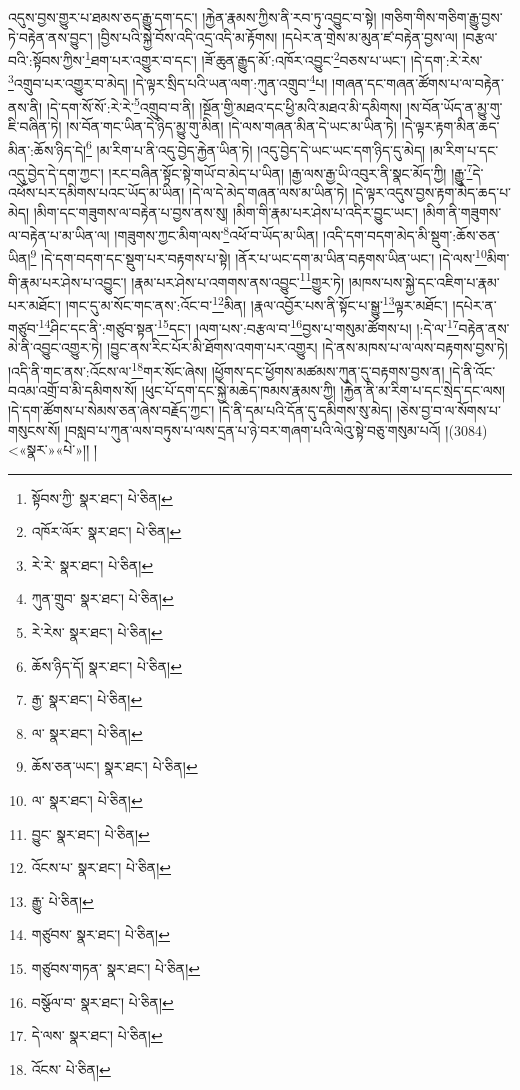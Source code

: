 འདུས་བྱས་གྱུར་པ་ཐམས་ཅད་རྒྱུ་དག་དང་། །རྐྱེན་རྣམས་ཀྱིས་ནི་རབ་ཏུ་འབྱུང་བ་སྟེ། །གཅིག་གིས་གཅིག་རྒྱུ་བྱས་ཏེ་བརྟེན་ནས་བྱུང་། །བྱིས་པའི་སྐྱེ་བོས་འདི་འདྲ་འདི་མ་རྟོགས། །དཔེར་ན་གྲེས་མ་མུན་ཛ་བརྟེན་བྱས་ལ། །བརྩལ་བའི་:སྟོབས་ཀྱིས་\footnote{སྟོབས་ཀྱི་  སྣར་ཐང་།  པེ་ཅིན། }ཐག་པར་འགྱུར་བ་དང་། །ཟོ་ཆུན་རྒྱུད་མོ་:འཁོར་འབྱུང་\footnote{འཁོར་ལོར་  སྣར་ཐང་།  པེ་ཅིན། }བཅས་པ་ཡང་། །དེ་དག་:རེ་རེས་\footnote{རེ་རེ་  སྣར་ཐང་།  པེ་ཅིན། }འགྲུབ་པར་འགྱུར་བ་མེད། །དེ་ལྟར་སྲིད་པའི་ཡན་ལག་:ཀུན་འགྲུབ་\footnote{ཀུན་གྲུབ་  སྣར་ཐང་།  པེ་ཅིན། }པ། །གཞན་དང་གཞན་ཚོགས་པ་ལ་བརྟེན་ནས་ནི། །དེ་དག་སོ་སོ་:རེ་རེ་\footnote{རེ་རེས་  སྣར་ཐང་།  པེ་ཅིན། }འགྲུབ་བ་ནི། །སྔོན་གྱི་མཐའ་དང་ཕྱི་མའི་མཐའ་མི་དམིགས། །ས་བོན་ཡོད་ན་མྱུ་གུ་ཇི་བཞིན་ཏེ། །ས་བོན་གང་ཡིན་དེ་ཉིད་མྱུ་གུ་མིན། །དེ་ལས་གཞན་མིན་དེ་ཡང་མ་ཡིན་ཏེ། །དེ་ལྟར་རྟག་མིན་ཆད་མིན་:ཆོས་ཉིད་དེ།\footnote{ཆོས་ཉིད་དོ།  སྣར་ཐང་།  པེ་ཅིན། } །མ་རིག་པ་ནི་འདུ་བྱེད་རྐྱེན་ཡིན་ཏེ། །འདུ་བྱེད་དེ་ཡང་ཡང་དག་ཉིད་དུ་མེད། །མ་རིག་པ་དང་འདུ་བྱེད་དེ་དག་ཀྱང་། །རང་བཞིན་སྟོང་སྟེ་གཡོ་བ་མེད་པ་ཡིན། །རྒྱ་ལས་རྒྱ་ཡི་འབུར་ནི་སྣང་མོད་ཀྱི། །རྒྱུ་\footnote{རྒྱ་  སྣར་ཐང་།  པེ་ཅིན། }དེ་འཕོས་པར་དམིགས་པའང་ཡོད་མ་ཡིན། །དེ་ལ་དེ་མེད་གཞན་ལས་མ་ཡིན་ཏེ། །དེ་ལྟར་འདུས་བྱས་རྟག་མེད་ཆད་པ་མེད། །མིག་དང་གཟུགས་ལ་བརྟེན་པ་བྱས་ནས་སུ། །མིག་གི་རྣམ་པར་ཤེས་པ་འདིར་བྱུང་ཡང་། །མིག་ནི་གཟུགས་ལ་བརྟེན་པ་མ་ཡིན་ལ། །གཟུགས་ཀྱང་མིག་ལས་\footnote{ལ་  སྣར་ཐང་།  པེ་ཅིན། }འཕོ་བ་ཡོད་མ་ཡིན། །འདི་དག་བདག་མེད་མི་སྡུག་:ཆོས་ཅན་ཡིན།\footnote{ཆོས་ཅན་ཡང་།  སྣར་ཐང་།  པེ་ཅིན། } །དེ་དག་བདག་དང་སྡུག་པར་བརྟགས་པ་སྟེ། །ནོར་པ་ཡང་དག་མ་ཡིན་བརྟགས་ཡིན་ཡང་། །དེ་ལས་\footnote{ལ་  སྣར་ཐང་།  པེ་ཅིན། }མིག་གི་རྣམ་པར་ཤེས་པ་འབྱུང་། །རྣམ་པར་ཤེས་པ་འགགས་ནས་འབྱུང་\footnote{བྱུང་  སྣར་ཐང་།  པེ་ཅིན། }གྱུར་ཏེ། །མཁས་པས་སྐྱེ་དང་འཇིག་པ་རྣམ་པར་མཐོང་། །གང་དུ་མ་སོང་གང་ནས་:འོང་བ་\footnote{འོངས་པ་  སྣར་ཐང་།  པེ་ཅིན། }མིན། །རྣལ་འབྱོར་པས་ནི་སྟོང་པ་སྒྱུ་\footnote{རྒྱུ་  པེ་ཅིན། }ལྟར་མཐོང་། །དཔེར་ན་གཙུབ་\footnote{གཙུབས་  སྣར་ཐང་།  པེ་ཅིན། }ཤིང་དང་ནི་:གཙུབ་སྟན་\footnote{གཙུབས་གཏན་  སྣར་ཐང་།  པེ་ཅིན། }དང་། །ལག་པས་:བརྩལ་བ་\footnote{བསྩོལ་བ་  སྣར་ཐང་།  པེ་ཅིན། }བྱས་པ་གསུམ་ཚོགས་པ། །:དེ་ལ་\footnote{དེ་ལས་  སྣར་ཐང་།  པེ་ཅིན། }བརྟེན་ནས་མེ་ནི་འབྱུང་འགྱུར་ཏེ། །བྱུང་ནས་རིང་པོར་མི་ཐོགས་འགག་པར་འགྱུར། །དེ་ནས་མཁས་པ་ལ་ལས་བརྟགས་བྱས་ཏེ། །འདི་ནི་གང་ནས་:འོངས་ལ་\footnote{འོངས་  པེ་ཅིན། }གར་སོང་ཞེས། །ཕྱོགས་དང་ཕྱོགས་མཚམས་ཀུན་དུ་བརྟགས་བྱས་ན། །དེ་ནི་འོང་བའམ་འགྲོ་བ་མི་དམིགས་སོ། །ཕུང་པོ་དག་དང་སྐྱེ་མཆེད་ཁམས་རྣམས་ཀྱི། །རྐྱེན་ནི་མ་རིག་པ་དང་སྲེད་དང་ལས། །དེ་དག་ཚོགས་པ་སེམས་ཅན་ཞེས་བརྗོད་ཀྱང་། །དེ་ནི་དམ་པའི་དོན་དུ་དམིགས་སུ་མེད། །ཅེས་བྱ་བ་ལ་སོགས་པ་གསུངས་སོ། །བསླབ་པ་ཀུན་ལས་བཏུས་པ་ལས་དྲན་པ་ཉེ་བར་གཞག་པའི་ལེའུ་སྟེ་བཅུ་གསུམ་པའོ། །(3084) <«སྣར་»«པེ་»།། །
